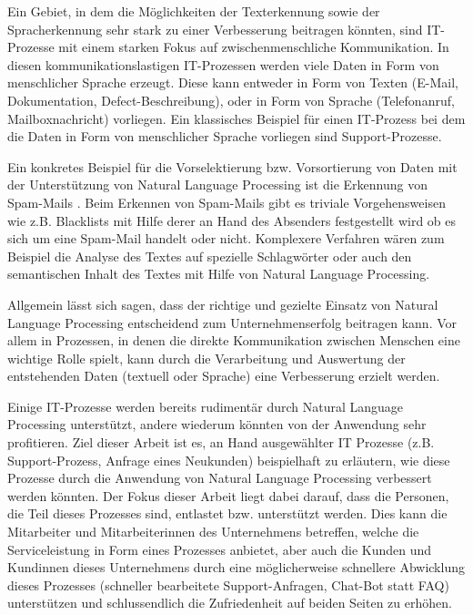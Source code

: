 Ein Gebiet, in dem die Möglichkeiten der Texterkennung sowie der Spracherkennung sehr stark zu einer Verbesserung beitragen könnten, sind IT-Prozesse mit einem starken Fokus auf zwischenmenschliche Kommunikation. In diesen kommunikationslastigen IT-Prozessen werden viele Daten in Form von menschlicher Sprache erzeugt. Diese kann entweder in Form von Texten (E-Mail, Dokumentation, Defect-Beschreibung), oder in Form von Sprache (Telefonanruf, Mailboxnachricht) vorliegen. Ein klassisches Beispiel für einen IT-Prozess bei dem die Daten in Form von menschlicher Sprache vorliegen sind Support-Prozesse. 

Ein konkretes Beispiel für die Vorselektierung bzw. Vorsortierung von Daten mit der Unterstützung von Natural Language Processing ist die Erkennung von Spam-Mails \cite{Dinsoreanu2014}. Beim Erkennen von Spam-Mails gibt es triviale Vorgehensweisen wie z.B. Blacklists mit Hilfe derer an Hand des Absenders festgestellt wird ob es sich um eine Spam-Mail handelt oder nicht. Komplexere Verfahren wären zum Beispiel die Analyse des Textes auf spezielle Schlagwörter oder auch den semantischen Inhalt des Textes mit Hilfe von Natural Language Processing.

Allgemein lässt sich sagen, dass der richtige und gezielte Einsatz von Natural Language Processing entscheidend zum Unternehmenserfolg beitragen kann. Vor allem in Prozessen, in denen die direkte Kommunikation zwischen Menschen eine wichtige Rolle spielt, kann durch die Verarbeitung und Auswertung der entstehenden Daten (textuell oder Sprache) eine Verbesserung erzielt werden.

Einige IT-Prozesse werden bereits rudimentär durch Natural Language Processing unterstützt, andere wiederum könnten von der Anwendung sehr profitieren. Ziel dieser Arbeit ist es, an Hand ausgewählter IT Prozesse (z.B. Support-Prozess, Anfrage eines Neukunden) beispielhaft zu erläutern, wie diese Prozesse durch die Anwendung von Natural Language Processing verbessert werden könnten. Der Fokus dieser Arbeit liegt dabei darauf, dass die Personen, die Teil dieses Prozesses sind, entlastet bzw. unterstützt werden. Dies kann die Mitarbeiter und Mitarbeiterinnen des Unternehmens betreffen, welche die Serviceleistung in Form eines Prozesses anbietet, aber auch die Kunden und Kundinnen dieses Unternehmens durch eine möglicherweise schnellere Abwicklung dieses Prozesses (schneller bearbeitete Support-Anfragen, Chat-Bot statt FAQ) unterstützen und schlussendlich die Zufriedenheit auf beiden Seiten zu erhöhen. 


